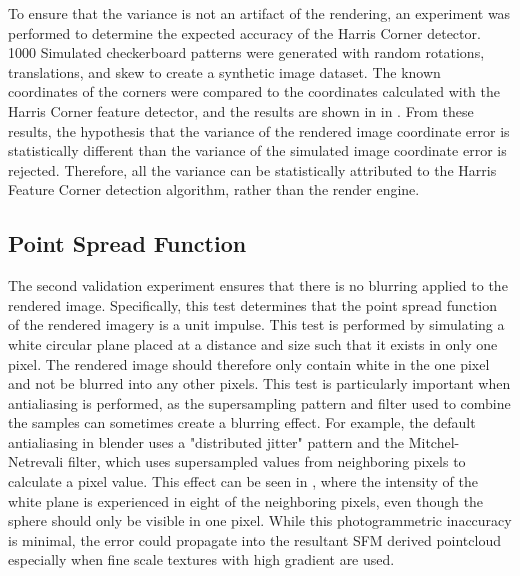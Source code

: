 



To ensure that the variance is not an artifact of the rendering, an experiment was performed to determine the expected accuracy of the Harris Corner detector.  1000 Simulated checkerboard patterns were generated with random rotations, translations, and skew to create a synthetic image dataset.  The known coordinates of the corners were compared to the coordinates calculated with the Harris Corner feature detector, and the results are shown in in .  From these results, the hypothesis that the variance of the rendered image coordinate error is statistically different than the variance of the simulated image coordinate error is rejected.  Therefore, all the variance can be statistically attributed to the Harris Feature Corner detection algorithm, rather than the render engine. 



\subsection{Point Spread Function}
The second validation experiment ensures that there is no blurring applied to the rendered image.  Specifically, this test determines that the point spread function of the rendered imagery is a unit impulse.  This test is performed by simulating a white circular plane placed at a distance and size such that it exists in only one pixel.  The rendered image should therefore only contain white in the one pixel and not be blurred into any other pixels.  This test is particularly important when antialiasing is performed, as the supersampling pattern and filter used to combine the samples can sometimes create a blurring effect.  For example, the default antialiasing in blender uses a "distributed jitter" pattern and the Mitchel-Netrevali filter, which uses supersampled values from neighboring pixels to calculate a pixel value.  This effect can be seen in , where the intensity of the white plane is experienced in eight of the neighboring pixels, even though the sphere should only be visible in one pixel.  While this photogrammetric inaccuracy is minimal, the error could propagate into the resultant SFM derived pointcloud especially when fine scale textures with high gradient are used.



